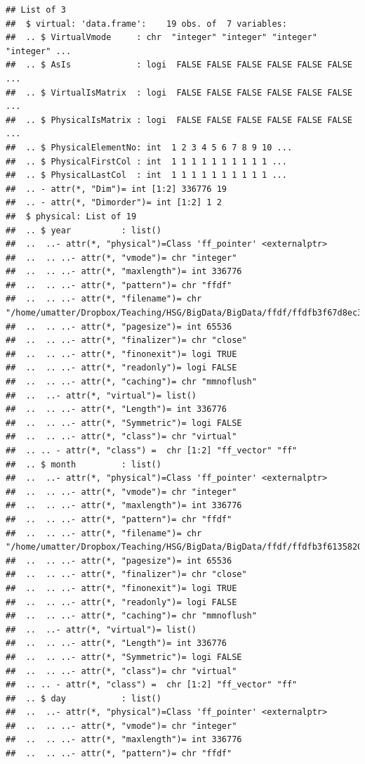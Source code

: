 \documentclass[
  12pt,
]{style/krantz}
\begin{document}
\begin{verbatim}
## List of 3
##  $ virtual: 'data.frame':    19 obs. of  7 variables:
##  .. $ VirtualVmode     : chr  "integer" "integer" "integer" "integer" ...
##  .. $ AsIs             : logi  FALSE FALSE FALSE FALSE FALSE FALSE ...
##  .. $ VirtualIsMatrix  : logi  FALSE FALSE FALSE FALSE FALSE FALSE ...
##  .. $ PhysicalIsMatrix : logi  FALSE FALSE FALSE FALSE FALSE FALSE ...
##  .. $ PhysicalElementNo: int  1 2 3 4 5 6 7 8 9 10 ...
##  .. $ PhysicalFirstCol : int  1 1 1 1 1 1 1 1 1 1 ...
##  .. $ PhysicalLastCol  : int  1 1 1 1 1 1 1 1 1 1 ...
##  .. - attr(*, "Dim")= int [1:2] 336776 19
##  .. - attr(*, "Dimorder")= int [1:2] 1 2
##  $ physical: List of 19
##  .. $ year          : list()
##  ..  ..- attr(*, "physical")=Class 'ff_pointer' <externalptr> 
##  ..  .. ..- attr(*, "vmode")= chr "integer"
##  ..  .. ..- attr(*, "maxlength")= int 336776
##  ..  .. ..- attr(*, "pattern")= chr "ffdf"
##  ..  .. ..- attr(*, "filename")= chr "/home/umatter/Dropbox/Teaching/HSG/BigData/BigData/ffdf/ffdfb3f67d8ec341.ff"
##  ..  .. ..- attr(*, "pagesize")= int 65536
##  ..  .. ..- attr(*, "finalizer")= chr "close"
##  ..  .. ..- attr(*, "finonexit")= logi TRUE
##  ..  .. ..- attr(*, "readonly")= logi FALSE
##  ..  .. ..- attr(*, "caching")= chr "mmnoflush"
##  ..  ..- attr(*, "virtual")= list()
##  ..  .. ..- attr(*, "Length")= int 336776
##  ..  .. ..- attr(*, "Symmetric")= logi FALSE
##  ..  .. ..- attr(*, "class")= chr "virtual"
##  .. .. - attr(*, "class") =  chr [1:2] "ff_vector" "ff"
##  .. $ month         : list()
##  ..  ..- attr(*, "physical")=Class 'ff_pointer' <externalptr> 
##  ..  .. ..- attr(*, "vmode")= chr "integer"
##  ..  .. ..- attr(*, "maxlength")= int 336776
##  ..  .. ..- attr(*, "pattern")= chr "ffdf"
##  ..  .. ..- attr(*, "filename")= chr "/home/umatter/Dropbox/Teaching/HSG/BigData/BigData/ffdf/ffdfb3f6135820f4.ff"
##  ..  .. ..- attr(*, "pagesize")= int 65536
##  ..  .. ..- attr(*, "finalizer")= chr "close"
##  ..  .. ..- attr(*, "finonexit")= logi TRUE
##  ..  .. ..- attr(*, "readonly")= logi FALSE
##  ..  .. ..- attr(*, "caching")= chr "mmnoflush"
##  ..  ..- attr(*, "virtual")= list()
##  ..  .. ..- attr(*, "Length")= int 336776
##  ..  .. ..- attr(*, "Symmetric")= logi FALSE
##  ..  .. ..- attr(*, "class")= chr "virtual"
##  .. .. - attr(*, "class") =  chr [1:2] "ff_vector" "ff"
##  .. $ day           : list()
##  ..  ..- attr(*, "physical")=Class 'ff_pointer' <externalptr> 
##  ..  .. ..- attr(*, "vmode")= chr "integer"
##  ..  .. ..- attr(*, "maxlength")= int 336776
##  ..  .. ..- attr(*, "pattern")= chr "ffdf"

\end{verbatim}
\end{document}
